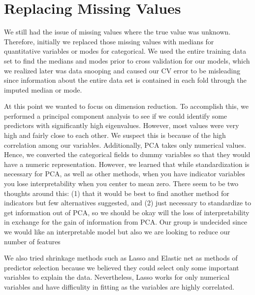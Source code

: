 \documentclass[12pt]{article}
\newcommand{\thanh}[1]{#1}
\begin{document}
\section{Replacing Missing Values}

We still had the issue of missing values where the true value was unknown. Therefore, initially we replaced those missing values with medians for quantitative variables or modes for categorical. We used the entire training data set to find the medians and modes prior to cross validation for our models, which we realized later was data snooping and caused our CV error to be misleading since information about the entire data set is contained in each fold through the imputed median or mode.

At this point we wanted to focus on dimension reduction. To accomplish this, we performed a principal component analysis to see if we could identify some predictors with significantly high eigenvalues. However, most values were very high and fairly close to each other. We suspect this is because of the high correlation among our variables.  Additionally, PCA takes only numerical values. %
Hence, we converted the categorical fields to dummy variables so that they would have a numeric representation. However, we learned that while standardization is necessary for PCA, as well as other methods, when you have indicator variables you lose interpretability when you center to mean zero.  There seem to be two thoughts around this: (1) that it would be best to find another method for indicators but few alternatives suggested, and (2) just necessary to standardize to get information out of PCA, so we should be okay will the loss of interpretability in exchange for the gain of information from PCA.  Our group is undecided since we would like an interpretable model but also we are looking to reduce our number of features

We also tried shrinkage methods such as Lasso and Elastic net as methods of predictor selection because we believed they could select only some important variables to explain the data. Nevertheless, Lasso works for only numerical variables %
and have difficulity in fitting as the variables are highly correlated.
\end{document}
